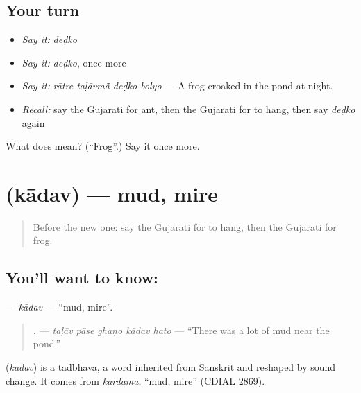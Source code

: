 \subsection*{Your turn}
\begin{itemize}
\raggedright
  \item \emph{Say it:} \emph{deḍko}
  \item \emph{Say it:} \emph{deḍko}, once more
  \item \emph{Say it:} \emph{rātre taḷāvmā̃ deḍko bolyo} — A frog croaked in the pond at night.
  \item \emph{Recall:} say the Gujarati for ant, then the Gujarati for to hang, then say \emph{deḍko} again
\end{itemize}

\begin{tcolorbox}[breakable,colback=teal!4,colframe=teal!35!black,title={Before you move on}]
What does  mean? (\textquotedblleft{}Frog\textquotedblright{}.) Say it once more.
\end{tcolorbox}
\section[\texorpdfstring{\gu{કાદવ} (kādav)}{કાદવ (kādav)}]{ (kādav) — mud, mire}

\label{lesson:GU-C239-kadav}



\begin{quote}
Before the new one: say the Gujarati for to hang, then the Gujarati for frog.
\end{quote}

\subsection*{You'll want to know: }
\textbf{} — \emph{kādav} — \textquotedblleft{}mud, mire\textquotedblright{}.

\begin{quote}
\textbf{    .} — \emph{taḷāv pāse ghaṇo kādav hato} — \textquotedblleft{}There was a lot of mud near the pond.\textquotedblright{}
\end{quote}

\begin{cousinweb}
\textbf{} (\emph{kādav}) is a tadbhava, a word inherited from Sanskrit and reshaped by sound change. It comes from \emph{kardama}, \textquotedblleft{}mud, mire\textquotedblright{} (CDIAL 2869).
\end{cousinweb}


